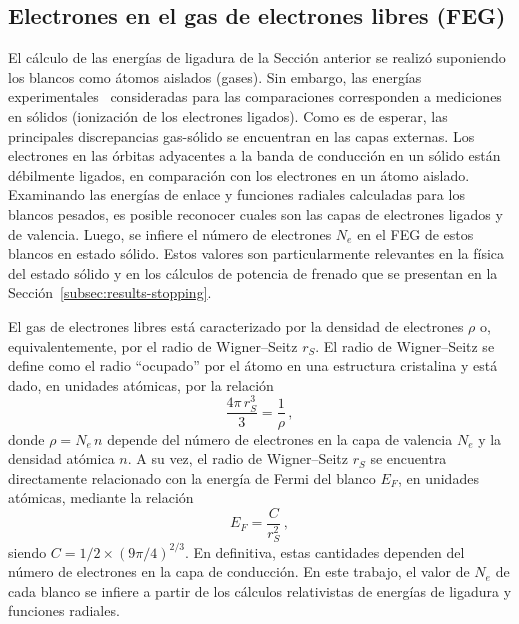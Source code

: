 \subsection{Electrones en el gas de electrones libres (FEG)}
\label{subsec:FEG}

El cálculo de las energías de ligadura de la Sección anterior se realizó 
suponiendo los blancos como átomos aislados (gases). Sin embargo, las 
energías experimentales~\cite{Williams:95} consideradas para las 
comparaciones corresponden a mediciones en sólidos (ionización de los 
electrones ligados). Como es de esperar, las principales discrepancias 
gas-sólido se encuentran en las capas externas. Los electrones en las 
órbitas adyacentes a la banda de conducción en un sólido están 
débilmente ligados, en comparación con los electrones en un átomo 
aislado. Examinando las energías de enlace y funciones radiales 
calculadas para los blancos pesados, es posible reconocer cuales son las 
capas de electrones 
ligados y de valencia. Luego, se infiere el número de electrones $N_e$ 
en el FEG de estos blancos en estado sólido. Estos valores son 
particularmente relevantes en la física del estado sólido y en los 
cálculos de potencia de frenado que se presentan en la 
Sección~\ref{subsec:results-stopping}.

El gas de electrones libres está caracterizado por la densidad de 
electrones $\rho$ o, equivalentemente, por el radio de Wigner--Seitz 
$r_S$. El radio de Wigner--Seitz se define como el radio ``ocupado'' por 
el átomo en una estructura cristalina y está dado, en unidades atómicas, 
por la relación
\begin{equation}
\frac{4\pi \,r_S^3}{3}=\frac{1}{\rho}\,,
\end{equation} 
donde $\rho=N_e \,n$ depende del número de electrones en la capa de 
valencia $N_e$ y la densidad atómica $n$. 
A su vez, el radio de Wigner--Seitz $r_S$ se encuentra directamente 
relacionado con la energía de Fermi del blanco $E_F$, en unidades 
atómicas, mediante la relación 
\begin{equation}
E_F=\frac{C}{r_S^2}\,,
\end{equation} 
siendo $C=1/2\times(9\pi/4)^{2/3}$. 
En definitiva, estas cantidades dependen del número de electrones en la 
capa de conducción. En este trabajo, el valor de $N_e$ de cada blanco se 
infiere a partir de los cálculos relativistas de energías de ligadura y 
funciones radiales.

